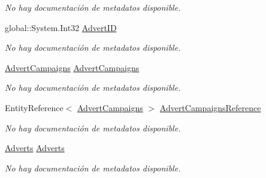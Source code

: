 \begin{DoxyCompactItemize}
\begin{DoxyCompactList}\small\item\em No hay documentación de metadatos disponible. \end{DoxyCompactList}\item 
global\-::\-System.\-Int32 \hyperlink{class_microsoft_1_1_samples_1_1_kinect_1_1_basic_interactions_1_1_advert_campaign_details_afee850570ed33d5a82ae58b3a25d2e65}{Advert\-I\-D}
\begin{DoxyCompactList}\small\item\em No hay documentación de metadatos disponible. \end{DoxyCompactList}\item 
\hyperlink{class_microsoft_1_1_samples_1_1_kinect_1_1_basic_interactions_1_1_advert_campaigns}{Advert\-Campaigns} \hyperlink{class_microsoft_1_1_samples_1_1_kinect_1_1_basic_interactions_1_1_advert_campaign_details_a5e8028b08bc97232cba0d53136dcce38}{Advert\-Campaigns}
\begin{DoxyCompactList}\small\item\em No hay documentación de metadatos disponible. \end{DoxyCompactList}\item 
Entity\-Reference$<$ \hyperlink{class_microsoft_1_1_samples_1_1_kinect_1_1_basic_interactions_1_1_advert_campaigns}{Advert\-Campaigns} $>$ \hyperlink{class_microsoft_1_1_samples_1_1_kinect_1_1_basic_interactions_1_1_advert_campaign_details_aa319d0d6051924934461358500b3f2f3}{Advert\-Campaigns\-Reference}
\begin{DoxyCompactList}\small\item\em No hay documentación de metadatos disponible. \end{DoxyCompactList}\item 
\hyperlink{class_microsoft_1_1_samples_1_1_kinect_1_1_basic_interactions_1_1_adverts}{Adverts} \hyperlink{class_microsoft_1_1_samples_1_1_kinect_1_1_basic_interactions_1_1_advert_campaign_details_af7e2e44cfdb528c7e1da01227495f954}{Adverts}
\begin{DoxyCompactList}\small\item\em No hay documentación de metadatos disponible. \end{DoxyCompactList}\item 

\end{DoxyCompactItemize}
